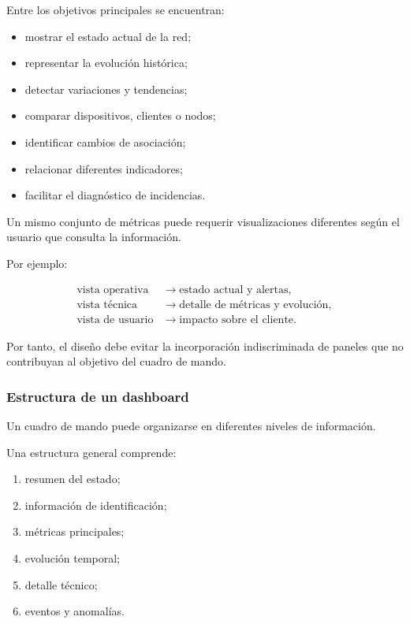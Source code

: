 Entre los objetivos principales se encuentran:

\begin{itemize}
    \item mostrar el estado actual de la red;

    \item representar la evolución histórica;

    \item detectar variaciones y tendencias;

    \item comparar dispositivos, clientes o nodos;

    \item identificar cambios de asociación;

    \item relacionar diferentes indicadores;

    \item facilitar el diagnóstico de incidencias.
\end{itemize}

Un mismo conjunto de métricas puede requerir visualizaciones diferentes
según el usuario que consulta la información.

Por ejemplo:

\[
\begin{aligned}
    \text{vista operativa}
    &\longrightarrow
    \text{estado actual y alertas},\\
    \text{vista técnica}
    &\longrightarrow
    \text{detalle de métricas y evolución},\\
    \text{vista de usuario}
    &\longrightarrow
    \text{impacto sobre el cliente}.
\end{aligned}
\]

Por tanto, el diseño debe evitar la incorporación indiscriminada de
paneles que no contribuyan al objetivo del cuadro de mando.


\subsubsection*{Estructura de un dashboard}

Un cuadro de mando puede organizarse en diferentes niveles de
información.

Una estructura general comprende:

\begin{enumerate}
    \item resumen del estado;

    \item información de identificación;

    \item métricas principales;

    \item evolución temporal;

    \item detalle técnico;

    \item eventos y anomalías.
\end{enumerate}

